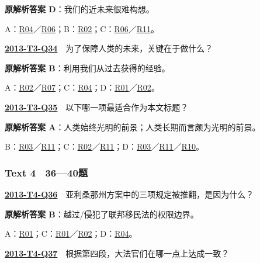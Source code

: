 \documentclass[11pt,a4paper]{article}
\begin{document}
\noindent\textbf{原解析答案 D}：我们的近未来很难构想。\par\nopagebreak
\noindent A：\hyperref[cat-R04]{R04}／\hyperref[cat-R06]{R06}；B：\hyperref[cat-R02]{R02}；C：\hyperref[cat-R06]{R06}／\hyperref[cat-R11]{R11}。\par\smallskip
{}\label{idx-2013-T3-Q34}\noindent\textbf{\href{https://zj139.github.io/math-notes/english/2d46a333fce8ad67ea684c5b/\#q34}{2013-T3-Q34}}　为了保障人类的未来，关键在于做什么？\par\nopagebreak
\noindent\textbf{原解析答案 B}：利用我们从过去获得的经验。\par\nopagebreak
\noindent A：\hyperref[cat-R02]{R02}／\hyperref[cat-R07]{R07}；C：\hyperref[cat-R04]{R04}；D：\hyperref[cat-R01]{R01}／\hyperref[cat-R02]{R02}。\par\smallskip
{}\label{idx-2013-T3-Q35}\noindent\textbf{\href{https://zj139.github.io/math-notes/english/2d46a333fce8ad67ea684c5b/\#q35}{2013-T3-Q35}}　以下哪一项最适合作为本文标题？\par\nopagebreak
\noindent\textbf{原解析答案 A}：人类始终光明的前景；人类长期而言颇为光明的前景。\par\nopagebreak
\noindent B：\hyperref[cat-R03]{R03}／\hyperref[cat-R11]{R11}；C：\hyperref[cat-R02]{R02}／\hyperref[cat-R11]{R11}；D：\hyperref[cat-R03]{R03}／\hyperref[cat-R11]{R11}／\hyperref[cat-R10]{R10}。\par\smallskip
{}\subsubsection{Text 4　36—40题}
\label{idx-2013-T4-Q36}\noindent\textbf{\href{https://zj139.github.io/math-notes/english/97d8ddcd3db235aaa541d5d5/\#q36}{2013-T4-Q36}}　亚利桑那州方案中的三项规定被推翻，是因为什么？\par\nopagebreak
\noindent\textbf{原解析答案 B}：越过/侵犯了联邦移民法的权限边界。\par\nopagebreak
\noindent A：\hyperref[cat-R01]{R01}；C：\hyperref[cat-R01]{R01}／\hyperref[cat-R02]{R02}；D：\hyperref[cat-R04]{R04}。\par\smallskip
{}\label{idx-2013-T4-Q37}\noindent\textbf{\href{https://zj139.github.io/math-notes/english/97d8ddcd3db235aaa541d5d5/\#q37}{2013-T4-Q37}}　根据第四段，大法官们在哪一点上达成一致？\par\nopagebreak
\end{document}
